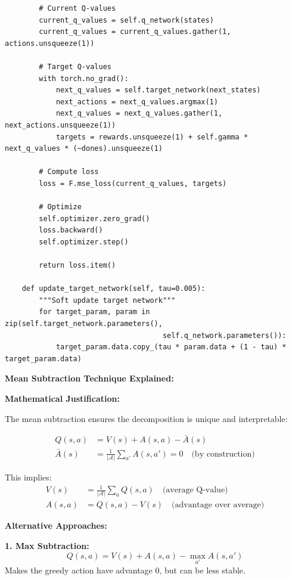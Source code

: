 \documentclass[12pt]{article}
\begin{document}
{{\begin{verbatim}
        # Current Q-values
        current_q_values = self.q_network(states)
        current_q_values = current_q_values.gather(1, actions.unsqueeze(1))
        
        # Target Q-values
        with torch.no_grad():
            next_q_values = self.target_network(next_states)
            next_actions = next_q_values.argmax(1)
            next_q_values = next_q_values.gather(1, next_actions.unsqueeze(1))
            targets = rewards.unsqueeze(1) + self.gamma * next_q_values * (~dones).unsqueeze(1)
        
        # Compute loss
        loss = F.mse_loss(current_q_values, targets)
        
        # Optimize
        self.optimizer.zero_grad()
        loss.backward()
        self.optimizer.step()
        
        return loss.item()
    
    def update_target_network(self, tau=0.005):
        """Soft update target network"""
        for target_param, param in zip(self.target_network.parameters(), 
                                     self.q_network.parameters()):
            target_param.data.copy_(tau * param.data + (1 - tau) * target_param.data)
\end{verbatim}

\textbf{Mean Subtraction Technique Explained:}

\textbf{Mathematical Justification:}

The mean subtraction ensures the decomposition is unique and interpretable:

\begin{align}
Q(s,a) &= V(s) + A(s,a) - \bar{A}(s) \\
\bar{A}(s) &= \frac{1}{|\mathcal{A}|}\sum_{a'} A(s,a') = 0 \quad \text{(by construction)}
\end{align}

This implies:
\begin{align}
V(s) &= \frac{1}{|\mathcal{A}|}\sum_a Q(s,a) \quad \text{(average Q-value)} \\
A(s,a) &= Q(s,a) - V(s) \quad \text{(advantage over average)}
\end{align}

\textbf{Alternative Approaches:}

\textbf{1. Max Subtraction:}
\begin{equation}
Q(s,a) = V(s) + A(s,a) - \max_{a'} A(s,a')
\end{equation}
Makes the greedy action have advantage 0, but can be less stable.

}}
\end{document}
